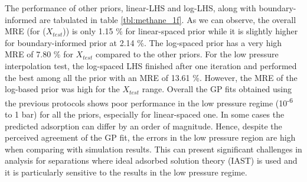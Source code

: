 \documentclass[twoside,twocolumn,9pt]{article}
\begin{document}
The performance of other priors, linear-LHS and log-LHS, along with boundary-informed are tabulated in table \ref{tbl:methane_1f}. As we can observe, the overall MRE (for ($X_{test}$)) is only 1.15 \% for linear-spaced prior while it is slightly higher for boundary-informed prior at 2.14 \%. The log-spaced prior has a very high MRE of 7.80 \% for $X_{test}$ compared to the other priors. For the low pressure interpolation test, the log-spaced LHS finished after one iteration and performed the best among all the prior with an MRE of 13.61 \%. However, the MRE of the log-based prior was high for the $X_{test}$ range. Overall the GP fits obtained using the previous protocols shows poor performance in the low pressure regime (10\textsuperscript{-6} to 1 bar) for all the priors, especially for linear-spaced one. In some cases the predicted adsorption can differ by an order of magnitude. Hence, despite the perceived agreement of the GP fit, the errors in the low pressure region are high when comparing with simulation results. This can present significant challenges in analysis for separations where ideal adsorbed solution theory (IAST) is used and it is particularly sensitive to the results in the low pressure regime.\cite{IAST_50}
\end{document}
